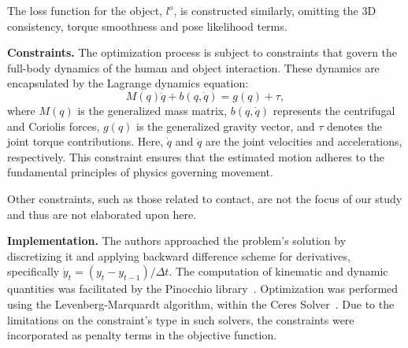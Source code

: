 The loss function for the object, \(l^o\), is constructed similarly, omitting the 3D consistency, torque smoothness and pose likelihood terms.

\noindent\textbf{Constraints.} The optimization process is subject to constraints that govern the full-body dynamics of the human and object 
interaction. These dynamics are encapsulated by the Lagrange dynamics equation:
\[
M(q)\ddot{q} + b(q, \dot{q}) = g(q) + \tau,
\]
where \( M(q) \) is the generalized mass matrix, \( b(q, \dot{q}) \) represents the centrifugal and Coriolis forces, \( g(q) \) is the 
generalized gravity vector, and \( \tau \) denotes the joint torque contributions. Here, \( \dot{q} \) and \( \ddot{q} \) are the joint 
velocities and accelerations, respectively. This constraint ensures that the estimated motion adheres to the fundamental principles of physics 
governing movement.

Other constraints, such as those related to contact, are not the focus of our study and thus are not elaborated upon here.

\noindent\textbf{Implementation.} The authors approached the problem's solution by discretizing it and applying backward difference scheme 
for derivatives, specifically \(\dot{y}_t = (y_t - y_{t - 1}) / \Delta t\). The computation of kinematic and dynamic quantities was facilitated 
by the Pinocchio library~\cite{carpentier2019pinocchio}. Optimization was performed using the Levenberg-Marquardt algorithm, within the Ceres 
Solver~\cite{Agarwal_Ceres_Solver_2022}. Due to the limitations on the constraint's type in such solvers, the constraints were incorporated as 
penalty terms in the objective function.


